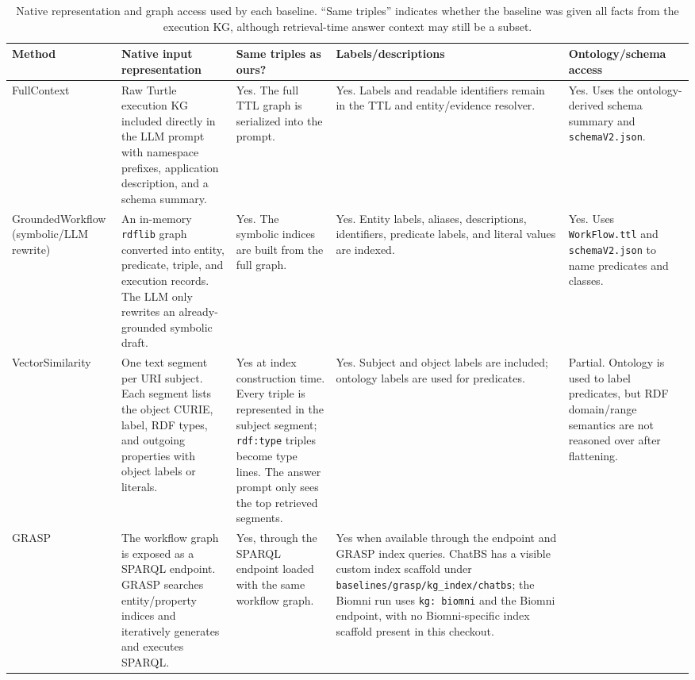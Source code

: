 \begin{table}[t]
\centering
\scriptsize
\caption{Native representation and graph access used by each baseline. ``Same triples'' indicates whether the baseline was given all facts from the execution KG, although retrieval-time answer context may still be a subset.}\label{tab:baseline-native-representations}
\begin{tabular}{@{}p{}p{}p{}p{}p{}@{}}
\toprule
Method & Native input representation & Same triples as ours? & Labels/descriptions & Ontology/schema access \\
\midrule
FullContext &
Raw Turtle execution KG included directly in the LLM prompt with namespace prefixes, application description, and a schema summary. &
Yes. The full TTL graph is serialized into the prompt. &
Yes. Labels and readable identifiers remain in the TTL and entity/evidence resolver. &
Yes. Uses the ontology-derived schema summary and \texttt{schemaV2.json}. \\
\addlinespace
GroundedWorkflow (symbolic/LLM rewrite) &
An in-memory \texttt{rdflib} graph converted into entity, predicate, triple, and execution records. The LLM only rewrites an already-grounded symbolic draft. &
Yes. The symbolic indices are built from the full graph. &
Yes. Entity labels, aliases, descriptions, identifiers, predicate labels, and literal values are indexed. &
Yes. Uses \texttt{WorkFlow.ttl} and \texttt{schemaV2.json} to name predicates and classes. \\
\addlinespace
VectorSimilarity &
One text segment per URI subject. Each segment lists the object CURIE, label, RDF types, and outgoing properties with object labels or literals. &
Yes at index construction time. Every triple is represented in the subject segment; \texttt{rdf:type} triples become type lines. The answer prompt only sees the top retrieved segments. &
Yes. Subject and object labels are included; ontology labels are used for predicates. &
Partial. Ontology is used to label predicates, but RDF domain/range semantics are not reasoned over after flattening. \\
\addlinespace
GRASP &
The workflow graph is exposed as a SPARQL endpoint\@. GRASP searches entity/property indices and iteratively generates and executes SPARQL\@. &
Yes, through the SPARQL endpoint loaded with the same workflow graph. &
Yes when available through the endpoint and GRASP index queries. ChatBS has a visible custom index scaffold under \texttt{baselines/grasp/kg\_index/chatbs}; the Biomni run uses \texttt{kg: biomni} and the Biomni endpoint, with no Biomni-specific index scaffold present in this checkout. &

\end{tabular}
\end{table}
